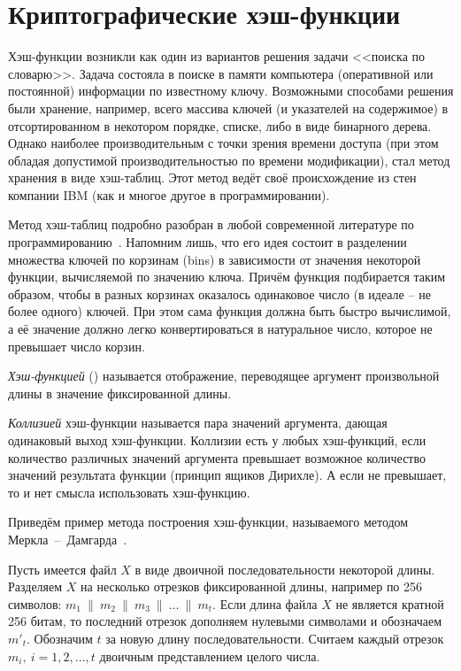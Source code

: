 \chapter{Криптографические хэш-функции}\label{chapter-hash-functions}

Хэш-функции возникли как один из вариантов решения задачи <<поиска по словарю>>. Задача состояла в поиске в памяти компьютера (оперативной или постоянной) информации по известному ключу. Возможными способами решения были хранение, например, всего массива ключей (и указателей на содержимое) в отсортированном в некотором порядке, списке, либо в виде бинарного дерева. Однако наиболее производительным с точки зрения времени доступа (при этом обладая допустимой производительностью по времени модификации), стал метод хранения в виде хэш-таблиц. Этот метод ведёт своё происхождение из стен компании IBM (как и многое другое в программировании).

Метод хэш-таблиц подробно разобран в любой современной литературе по программированию~\cite{Knuth:2001:3}. Напомним лишь, что его идея состоит в разделении множества ключей по корзинам (bins) в зависимости от значения некоторой функции, вычисляемой по значению ключа. Причём функция подбирается таким образом, чтобы в разных корзинах оказалось одинаковое число (в идеале -- не более одного) ключей. При этом сама функция должна быть быстро вычислимой, а её значение должно легко конвертироваться в натуральное число, которое не превышает число корзин.

\emph{Хэш-функцией} () называется отображение, переводящее аргумент произвольной длины в значение фиксированной длины.

\emph{Коллизией} хэш-функции называется пара значений аргумента, дающая одинаковый выход хэш-функции. Коллизии есть у любых хэш-функций, если количество различных значений аргумента превышает возможное количество значений результата функции (принцип ящиков Дирихле). А если не превышает, то и нет смысла использовать хэш-функцию.

\example
Приведём пример метода построения хэш-функции, называемого методом Меркла~--~Дамгарда~\cite{Merkle:1979, Merkle:1990, Damgard:1990}.

Пусть имеется файл $X$ в виде двоичной последовательности некоторой длины. Разделяем $X$ на несколько отрезков фиксированной длины, например по 256 символов:  $m_{1} ~\|~ m_{2} ~\|~ m_{3} ~\|~ \ldots ~\|~ m_{t}$. Если длина файла $X$ не является кратной 256 битам, то последний отрезок дополняем нулевыми символами и обозначаем $m'_{t}$.
Обозначим $t$ за новую длину последовательности. Считаем каждый отрезок $m_i, ~ i = 1, 2, \dots, t$ двоичным представлением целого числа.

